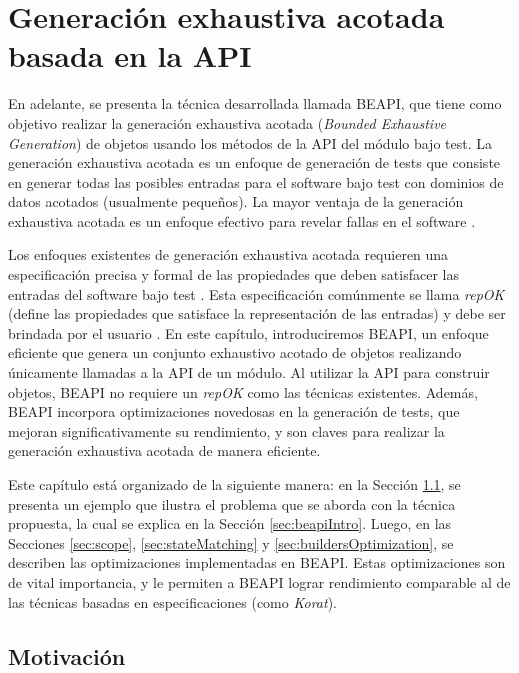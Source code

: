 \chapter{Generación exhaustiva acotada basada en la API}
\label{cap:beapi}

En adelante, se presenta la técnica desarrollada llamada BEAPI, que tiene como
objetivo realizar la generación exhaustiva acotada (\emph{Bounded Exhaustive Generation}) 
de objetos usando los métodos de la API del módulo bajo test. 
La generación exhaustiva acotada es un enfoque de generación de tests que
consiste en generar todas las posibles entradas para el software bajo test con
dominios de datos acotados (usualmente pequeños). 
La mayor ventaja de la generación exhaustiva acotada es un enfoque efectivo para
revelar fallas en el software \cite{} . 

Los enfoques existentes de generación exhaustiva acotada requieren una
especificación precisa y formal de las propiedades que deben satisfacer las
entradas del software bajo test \cite{} . 
Esta especificación comúnmente se llama \emph{repOK} (define las propiedades que
satisface la representación de las entradas) y debe ser brindada por el usuario \cite{} .
En este capítulo, introduciremos BEAPI, un enfoque eficiente que genera un
conjunto exhaustivo acotado de objetos realizando únicamente llamadas a la API
de un módulo. Al utilizar la API para construir objetos, BEAPI no requiere 
un \emph{repOK} como las técnicas existentes. 
Además, BEAPI incorpora optimizaciones novedosas en la generación de tests, que
mejoran significativamente su rendimiento, y son claves para realizar la generación exhaustiva acotada de manera eficiente. 

Este capítulo está organizado de la siguiente manera: en la Sección \ref{sec:motivating-example}, 
se presenta un ejemplo que ilustra el problema que se aborda con la técnica propuesta, 
la cual se explica en la Sección \ref{sec:beapiIntro}. Luego, en las Secciones \ref{sec:scope}, \ref{sec:stateMatching} y
 \ref{sec:buildersOptimization}, se describen las optimizaciones implementadas en BEAPI. 
 Estas optimizaciones son de vital importancia, y le permiten a BEAPI 
lograr rendimiento comparable al de las técnicas basadas en especificaciones
(como \emph{Korat}\cite{Boyapati02}). 


\section[Motivación]{Motivación}
\label{sec:motivating-example}


